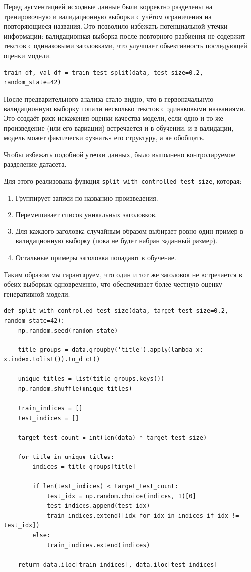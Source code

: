 \documentclass[coursework]{SCWorks}
\begin{document}
    Перед аугментацией исходные данные были корректно разделены на тренировочную и валидационную выборки с учётом ограничения
    на повторяющиеся названия.
    Это позволило избежать потенциальной утечки информации: валидационная выборка после повторного разбиения не содержит текстов
    с одинаковыми заголовками, что улучшает объективность последующей оценки модели.

    \begin{verbatim}
train_df, val_df = train_test_split(data, test_size=0.2, random_state=42)
    \end{verbatim}

    После предварительного анализа стало видно, что в первоначальную валидационную выборку попали несколько текстов
    с одинаковыми названиями.
    Это создаёт риск искажения оценки качества модели, если одно и то же произведение (или его вариации) встречается и в обучении,
    и в валидации, модель может фактически «узнать» его структуру, а не обобщать.

    Чтобы избежать подобной утечки данных, было выполнено контролируемое разделение датасета.

    Для этого реализована функция \texttt{split\_with\_controlled\_test\_size}, которая:
    \begin{enumerate}
        \item Группирует записи по названию произведения.
        \item Перемешивает список уникальных заголовков.
        \item Для каждого заголовка случайным образом выбирает ровно один пример в валидационную выборку (пока не будет набран заданный размер).
        \item Остальные примеры заголовка попадают в обучение.
    \end{enumerate}


    Таким образом мы гарантируем, что один и тот же заголовок не встречается в обеих выборках одновременно,
    что обеспечивает более честную оценку генеративной модели.

    \begin{verbatim}
def split_with_controlled_test_size(data, target_test_size=0.2, random_state=42):
    np.random.seed(random_state)

    title_groups = data.groupby('title').apply(lambda x: x.index.tolist()).to_dict()

    unique_titles = list(title_groups.keys())
    np.random.shuffle(unique_titles)

    train_indices = []
    test_indices = []

    target_test_count = int(len(data) * target_test_size)

    for title in unique_titles:
        indices = title_groups[title]

        if len(test_indices) < target_test_count:
            test_idx = np.random.choice(indices, 1)[0]
            test_indices.append(test_idx)
            train_indices.extend([idx for idx in indices if idx != test_idx])
        else:
            train_indices.extend(indices)

    return data.iloc[train_indices], data.iloc[test_indices]
    \end{verbatim}
\end{document}

